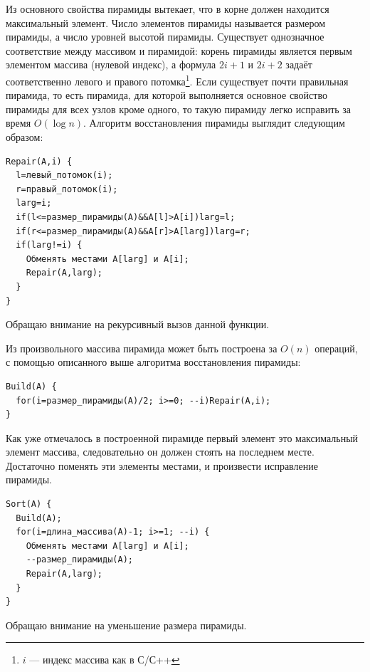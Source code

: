 \documentclass[12pt]{article}
\begin{document}
Из основного свойства пирамиды вытекает, что в корне должен находится максимальный элемент. Число элементов пирамиды называется размером пирамиды, а число уровней высотой пирамиды. Существует однозначное соответствие между массивом и пирамидой: корень пирамиды является первым элементом массива (нулевой индекс), а формула $ 2i+1 $ и $ 2i+2 $ задаёт соответственно левого и правого потомка\footnote{$i$ — индекс массива как в С/С++}. Если существует почти правильная пирамида, то есть пирамида, для которой выполняется основное свойство пирамиды для всех узлов кроме одного, то такую пирамиду легко исправить за время $ O(\log{}n) $. Алгоритм восстановления пирамиды выглядит следующим образом:
\begin{verbatim}
Repair(A,i) {
  l=левый_потомок(i);
  r=правый_потомок(i);
  larg=i;
  if(l<=размер_пирамиды(А)&&A[l]>A[i])larg=l;
  if(r<=размер_пирамиды(А)&&A[r]>A[larg])larg=r;
  if(larg!=i) {
    Обменять местами A[larg] и A[i];
    Repair(A,larg);
  }
}
\end{verbatim}
Обращаю внимание на рекурсивный вызов данной функции.

Из произвольного массива пирамида может быть построена за $ O(n) $ операций, с помощью описанного выше алгоритма восстановления пирамиды:
\begin{verbatim}
Build(A) {
  for(i=размер_пирамиды(А)/2; i>=0; --i)Repair(A,i);
}
\end{verbatim}

Как уже отмечалось в построенной пирамиде первый элемент это максимальный элемент массива, следовательно он должен стоять на последнем месте. Достаточно поменять эти элементы местами, и произвести исправление пирамиды.
\begin{verbatim}
Sort(A) {
  Build(A);
  for(i=длина_массива(А)-1; i>=1; --i) {
    Обменять местами A[larg] и A[i];
    --размер_пирамиды(А);
    Repair(A,larg);
  }
}
\end{verbatim}
Обращаю внимание на уменьшение размера пирамиды.
\end{document}
